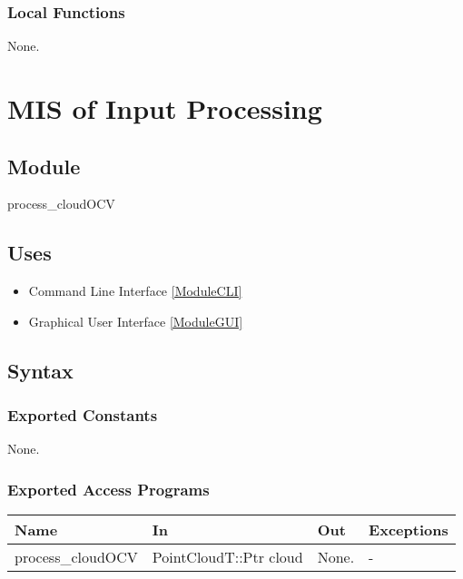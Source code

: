\documentclass[12pt, titlepage]{article}
\begin{document}
\subsubsection{Local Functions}

None.

\newpage

\section{MIS of Input Processing} \label{ModuleIP} 


\subsection{Module}

process\_cloudOCV

\subsection{Uses}

\begin{itemize}
\item Command Line Interface \ref{ModuleCLI}
\item Graphical User Interface \ref{ModuleGUI}
\end{itemize}

\subsection{Syntax}

\subsubsection{Exported Constants}

None.

\subsubsection{Exported Access Programs}

\begin{center}
\begin{tabular}{p{4cm} p{4cm} p{2cm} p{2cm}}
\hline
\textbf{Name} & \textbf{In} & \textbf{Out} & \textbf{Exceptions} \\
\hline
process\_cloudOCV & PointCloudT::Ptr cloud & None. & - \\
\hline
\end{tabular}
\end{center}
\end{document}
